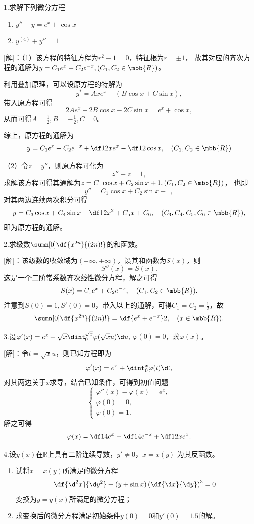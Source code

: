 1.求解下列微分方程
  \begin{enumerate}[(1)]
    \setlength{\itemindent}{1cm}
    \item $y''-y=e^x+\cos x$
    \item $y^{(4)}+y''=1$
  \end{enumerate}

[解]：（1）该方程的特征方程为$r^2-1=0$，特征根为$r=\pm1$，
故其对应的齐次方程的通解为$y=C_1e^x+C_2e^{-x},(C_1,C_2\in\mbb{R})$。

利用叠加原理，可以设原方程的特解为
$$y^*=Axe^x+(B\cos x+C\sin x),$$
带入原方程可得
$$2Ae^x-2B\cos x-2C\sin x=e^x+\cos x,$$
从而可得$A=\frac12,B=-\frac12,C=0$。

综上，原方程的通解为
$$y=C_1e^x+C_2e^{-x}+\df12xe^x-\df12\cos x,\quad (C_1,C_2\in\mbb{R})$$

\bs

（2）令$z=y''$，则原方程可化为
$$z''+z=1,$$
求解该方程可得其通解为$z=C_1\cos x+C_2\sin x+1,(C_1,C_2\in\mbb{R})$，
也即
$$y''=C_1\cos x+C_2\sin x+1,$$
对其两边连续两次积分可得
$$y=C_3\cos x+C_4\sin x+\df12x^2+C_5x+C_6,\quad (C_3,C_4,C_5,C_6\in\mbb{R}),$$
即为原方程的通解。\fin

\bs

2.求级数$\sumn[0]\df{x^{2n}}{(2n)!}$的和函数。

[解]：该级数的收敛域为$(-\infty,+\infty)$，设其和函数为$S(x)$，则
$$S''(x)=S(x).$$
这是一个二阶常系数齐次线性微分方程，解之可得
$$S(x)=C_1e^x+C_2e^{-x},\quad(C_1,C_2\in\mbb{R}).$$
注意到$S(0)=1,S'(0)=0$，带入以上的通解，可得$C_1=C_2=\frac12$，故
$$\sumn[0]\df{x^{2n}}{(2n)!}=\df{e^x+e^{-x}}2,\quad(x\in\mbb{R}).$$
\fin

\bs

3.设$\varphi'(x)=e^x+\sqrt x\dint_0^{\sqrt x}\varphi(\sqrt x u)\d u,$
$\varphi(0)=0$，求$\varphi(x)$。

[解]：令$t=\sqrt xu$，则已知方程即为
$$\varphi'(x)=e^x+\dint_0^x\varphi(t)\d t,$$
对其两边关于$x$求导，结合已知条件，可得到初值问题
$$
	\left\{\begin{array}{l}
		\varphi''(x)-\varphi(x)=e^x,\\
		\varphi(0)=0,\\
		\varphi(0)=1.
	\end{array}\right.
$$
解之可得
$$\varphi(x)=\df14e^x-\df14e^{-x}+\df12xe^x.$$
\fin

\bs

4.设$y(x)$在$\mathbb{R}$上具有二阶连续导数，$y'\ne 0$，$x=x(y)$
  为其反函数。
    \begin{enumerate}[(1)]
      \setlength{\itemindent}{1cm}
      \item 试将$x=x(y)$所满足的微分方程
      $$\df{\d^2x}{\d y^2}+(y+\sin x)\left(\df{\d x}{\d y}\right)^3=0$$
      变换为$y=y(x)$所满足的微分方程；%
      \item 求变换后的微分方程满足初始条件$y(0)=0$和$y'(0)=1.5$的解。
    \end{enumerate}

